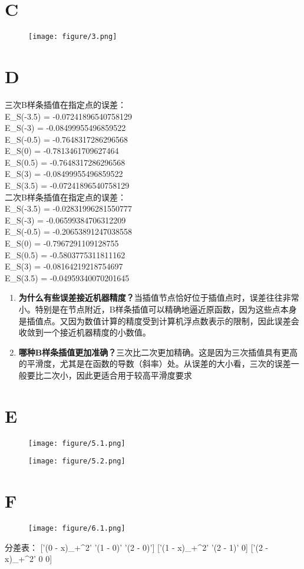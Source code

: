 \documentclass[a4paper]{article}
\begin{document}
\section*{C}
\begin{figure}[H]
    \centering
    \texttt{[image: figure/3.png]}
    \caption{}
    \label{fig:example}
\end{figure}
\section*{D}
三次B样条插值在指定点的误差：\\
E_S(-3.5) = -0.07241896540758129\\
E_S(-3) = -0.08499955496859522\\
E_S(-0.5) = -0.7648317286296568\\
E_S(0) = -0.7813461709627464\\
E_S(0.5) = -0.7648317286296568\\
E_S(3) = -0.08499955496859522\\
E_S(3.5) = -0.07241896540758129\\

二次B样条插值在指定点的误差：\\
E_S(-3.5) = -0.02831996281550777\\
E_S(-3) = -0.06599384706312209\\
E_S(-0.5) = -0.20653891247038558\\
E_S(0) = -0.7967291109128755\\
E_S(0.5) = -0.5803775311811162\\
E_S(3) = -0.08164219218754697\\
E_S(3.5) = -0.04959340070201645\\

\begin{enumerate}
    \item \textbf{为什么有些误差接近机器精度？}当插值节点恰好位于插值点时，误差往往非常小。特别是在节点附近，B样条插值可以精确地逼近原函数，因为这些点本身是插值点。又因为数值计算的精度受到计算机浮点数表示的限制，因此误差会收敛到一个接近机器精度的小数值。
    \item \textbf{哪种B样条插值更加准确？}三次比二次更加精确。这是因为三次插值具有更高的平滑度，尤其是在函数的导数（斜率）处。从误差的大小看，三次的误差一般要比二次小，因此更适合用于较高平滑度要求
\end{enumerate}


\section*{E}
\begin{figure}[H]
    \centering
    \texttt{[image: figure/5.1.png]}
    \caption{}
    \label{fig:example}
\end{figure}
\begin{figure}[H]
    \centering
    \texttt{[image: figure/5.2.png]}
    \caption{}
    \label{fig:example}
\end{figure}
\section*{F}
\begin{figure}[H]
    \centering
    \texttt{[image: figure/6.1.png]}
    \caption{}
    \label{fig:example}
\end{figure}
分差表：
['(0 - x)_+^2' '(1 - 0)' '(2 - 0)']
['(1 - x)_+^2' '(2 - 1)' 0]
['(2 - x)_+^2' 0 0]
\end{document}
